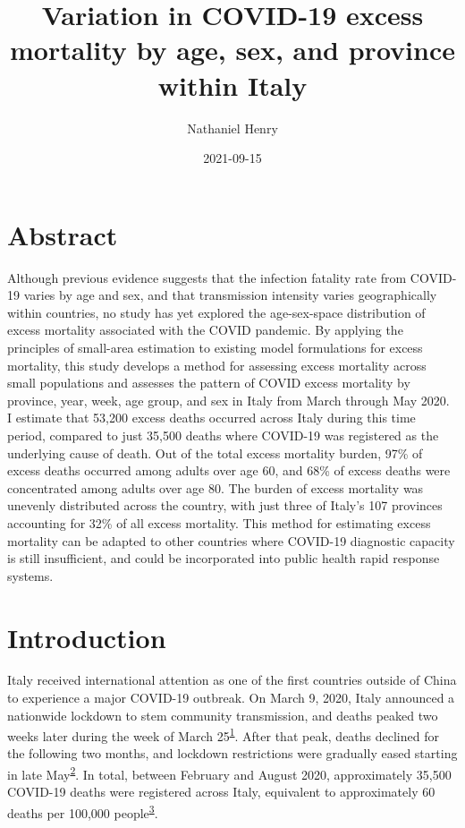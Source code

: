 \documentclass[
]{article}
\title{Variation in COVID-19 excess mortality by age, sex, and province within Italy}
\author{Nathaniel Henry\textsuperscript{}}
\date{2021-09-15}
\begin{document}
\maketitle

\hypertarget{abstract}{%
\section{Abstract}\label{abstract}}

Although previous evidence suggests that the infection fatality rate from COVID-19 varies by age and sex, and that transmission intensity varies geographically within countries, no study has yet explored the age-sex-space distribution of excess mortality associated with the COVID pandemic. By applying the principles of small-area estimation to existing model formulations for excess mortality, this study develops a method for assessing excess mortality across small populations and assesses the pattern of COVID excess mortality by province, year, week, age group, and sex in Italy from March through May 2020. I estimate that 53,200 excess deaths occurred across Italy during this time period, compared to just 35,500 deaths where COVID-19 was registered as the underlying cause of death. Out of the total excess mortality burden, 97\% of excess deaths occurred among adults over age 60, and 68\% of excess deaths were concentrated among adults over age 80. The burden of excess mortality was unevenly distributed across the country, with just three of Italy's 107 provinces accounting for 32\% of all excess mortality. This method for estimating excess mortality can be adapted to other countries where COVID-19 diagnostic capacity is still insufficient, and could be incorporated into public health rapid response systems.

\hypertarget{introduction}{%
\section{Introduction}\label{introduction}}

Italy received international attention as one of the first countries outside of China to experience a major COVID-19 outbreak. On March 9, 2020, Italy announced a nationwide lockdown to stem community transmission, and deaths peaked two weeks later during the week of March 25\textsuperscript{\protect\hyperlink{ref-Sebastiani2020}{1}}⁠. After that peak, deaths declined for the following two months, and lockdown restrictions were gradually eased starting in late May\textsuperscript{\protect\hyperlink{ref-Alicandro2020}{2}}⁠. In total, between February and August 2020, approximately 35,500 COVID-19 deaths were registered across Italy, equivalent to approximately 60 deaths per 100,000 people\textsuperscript{\protect\hyperlink{ref-InstituteforHealthMetricsandEvaluationIHME2020}{3}}.
\end{document}
